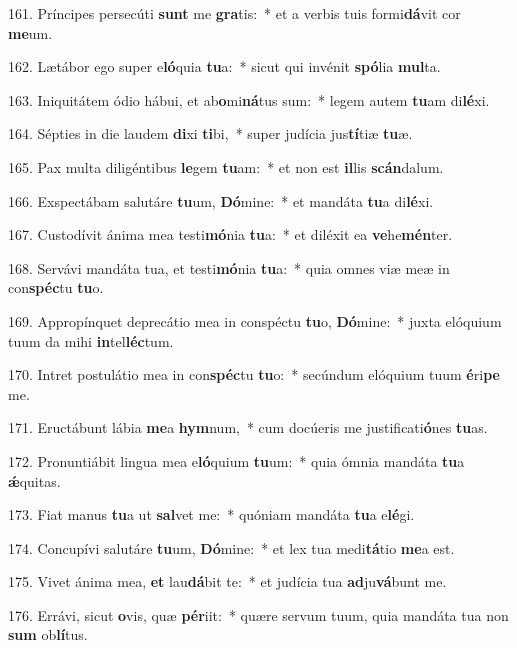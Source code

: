 161. Príncipes persecúti \textbf{sunt} me \textbf{gra}tis:~*  et a verbis tuis formi\textbf{dá}vit cor \textbf{me}um.\

162. Lætábor ego super e\textbf{ló}quia \textbf{tu}a:~*  sicut qui invénit \textbf{spó}lia \textbf{mul}ta.\

163. Iniquitátem ódio hábui, et ab\textbf{o}mi\textbf{ná}tus sum:~*  legem autem \textbf{tu}am di\textbf{lé}xi.\

164. Sépties in die laudem \textbf{di}xi \textbf{ti}bi,~*  super judícia jus\textbf{tí}tiæ \textbf{tu}æ.\

165. Pax multa diligéntibus \textbf{le}gem \textbf{tu}am:~*  et non est \textbf{il}lis \textbf{scán}dalum.\

166. Exspectábam salutáre \textbf{tu}um, \textbf{Dó}mine:~*  et mandáta \textbf{tu}a di\textbf{lé}xi.\

167. Custodívit ánima mea testi\textbf{mó}nia \textbf{tu}a:~*  et diléxit ea \textbf{ve}he\textbf{mén}ter.\

168. Servávi mandáta tua, et testi\textbf{mó}nia \textbf{tu}a:~*  quia omnes viæ meæ in con\textbf{spéc}tu \textbf{tu}o.\

169. Appropínquet deprecátio mea in conspéctu \textbf{tu}o, \textbf{Dó}mine:~*  juxta elóquium tuum da mihi \textbf{in}tel\textbf{léc}tum.\

170. Intret postulátio mea in con\textbf{spéc}tu \textbf{tu}o:~*  secúndum elóquium tuum \textbf{é}ri\textbf{pe} me.\

171. Eructábunt lábia \textbf{me}a \textbf{hym}num,~*  cum docúeris me justificati\textbf{ó}nes \textbf{tu}as.\

172. Pronuntiábit lingua mea e\textbf{ló}quium \textbf{tu}um:~*  quia ómnia mandáta \textbf{tu}a \textbf{ǽ}quitas.\

173. Fiat manus \textbf{tu}a ut \textbf{sal}vet me:~*  quóniam mandáta \textbf{tu}a e\textbf{lé}gi.\

174. Concupívi salutáre \textbf{tu}um, \textbf{Dó}mine:~*  et lex tua medi\textbf{tá}tio \textbf{me}a est.\

175. Vivet ánima mea, \textbf{et} lau\textbf{dá}bit te:~*  et judícia tua \textbf{ad}ju\textbf{vá}bunt me.\

176. Errávi, sicut \textbf{o}vis, quæ \textbf{pér}iit:~*  quære servum tuum, quia mandáta tua non \textbf{sum} ob\textbf{lí}tus.\

